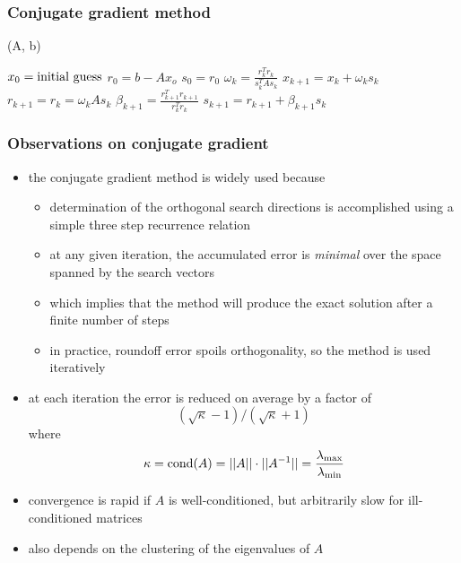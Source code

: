 \begin{frame}[fragile]
%
  \frametitle{Conjugate gradient method}
%
  \begin{center}
    \begin{minipage}{.85\linewidth}
      \begin{algorithm}[H]
        \label{alg:conjugate-gradient}
%
          \DontPrintSemicolon
          \SetAlCapHSkip{0ex}
%
          \caption{\CGM(A, b)}
%
          $x_{0} = {\rm initial\ guess}$\;
          $r_{0} = b - A x_{o}$\;
          $s_{0} = r_{0}$ \;
           {
            $\omega_{k} = \frac{r^{T}_{k} r_{k}}{s_{k}^{T}As_{k}}$ \;
            $x_{k+1}  = x_{k} + \omega_{k} s_{k}$ \;
            $r_{k+1} = r_{k} = \omega_{k} A s_{k}$ \;
            $\beta_{k+1}  = \frac{r^{T}_{k+1} r_{k+1}}{r^{T}_{k} r_{k}}$ \;
            $s_{k+1}   = r_{k+1} + \beta_{k+1} s_{k}$
          }
%
        \end{algorithm}
      \end{minipage}
    \end{center}
%
\end{frame}

\begin{frame}[fragile]
%
  \frametitle{Observations on conjugate gradient}
%
  \begin{itemize}
%
  \item the conjugate gradient method is widely used because
    \begin{itemize}
    \item determination of the orthogonal search directions is accomplished using a simple
      three step recurrence relation
    \item at any given iteration, the accumulated error is {\em minimal} over the space spanned
      by the search vectors
    \item which implies that the method will produce the exact solution after a finite number
      of steps
    \item in practice, roundoff error spoils orthogonality, so the method is used iteratively
    \end{itemize}
%
  \item at each iteration the error is reduced on average by a factor of
    \begin{equation}
      (\sqrt{\kappa} - 1)/(\sqrt{\kappa} + 1)
    \end{equation}
    where 
    \begin{equation}
      \kappa
      = {\rm cond}(A)
      = ||A|| \cdot ||A^{-1}||
      = \frac{\lambda_{\rm max}}{\lambda_{\rm min}}
    \end{equation}
%
  \item convergence is rapid if $A$ is well-conditioned, but arbitrarily slow for
    ill-conditioned matrices
  \item also depends on the clustering of the eigenvalues of $A$
%
  \end{itemize}
%
\end{frame}

